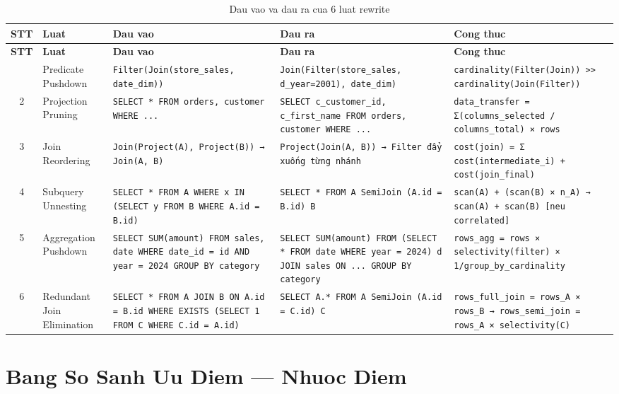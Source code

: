 \begin{longtable}{|c|p{3cm}|p{5cm}|p{5cm}|p{4cm}|}
\caption{Dau vao va dau ra cua 6 luat rewrite} \\
\hline
{\bf STT} & {\bf Luat} & {\bf Dau vao} & {\bf Dau ra} & {\bf Cong thuc} \\ \hline
\endfirsthead
\hline
{\bf STT} & {\bf Luat} & {\bf Dau vao} & {\bf Dau ra} & {\bf Cong thuc} \\ \hline
\endhead
\endfoot
\endlastfoot
1 & Predicate Pushdown & \texttt{Filter(Join(store_sales, date_dim))} & \texttt{Join(Filter(store_sales, d_year=2001), date_dim)} & \texttt{cardinality(Filter(Join)) >> cardinality(Join(Filter))} \\ \hline
2 & Projection Pruning & \texttt{SELECT * FROM orders, customer WHERE ...} & \texttt{SELECT c_customer_id, c_first_name FROM orders, customer WHERE ...} & \texttt{data_transfer = Σ(columns_selected / columns_total) × rows} \\ \hline
3 & Join Reordering & \texttt{Join(Project(A), Project(B)) → Join(A, B)} & \texttt{Project(Join(A, B)) → Filter đẩy xuống từng nhánh} & \texttt{cost(join) = Σ cost(intermediate_i) + cost(join_final)} \\ \hline
4 & Subquery Unnesting & \texttt{SELECT * FROM A WHERE x IN (SELECT y FROM B WHERE A.id = B.id)} & \texttt{SELECT * FROM A SemiJoin (A.id = B.id) B} & \texttt{scan(A) + (scan(B) × n_A) → scan(A) + scan(B) [neu correlated]} \\ \hline
5 & Aggregation Pushdown & \texttt{SELECT SUM(amount) FROM sales, date WHERE date_id = id AND year = 2024 GROUP BY category} & \texttt{SELECT SUM(amount) FROM (SELECT * FROM date WHERE year = 2024) d JOIN sales ON ... GROUP BY category} & \texttt{rows_agg = rows × selectivity(filter) × 1/group_by_cardinality} \\ \hline
6 & Redundant Join Elimination & \texttt{SELECT * FROM A JOIN B ON A.id = B.id WHERE EXISTS (SELECT 1 FROM C WHERE C.id = A.id)} & \texttt{SELECT A.* FROM A SemiJoin (A.id = C.id) C} & \texttt{rows_full_join = rows_A × rows_B → rows_semi_join = rows_A × selectivity(C)} \\ \hline
\end{longtable}

\section{Bang So Sanh Uu Diem — Nhuoc Diem}

